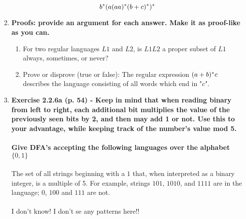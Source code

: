 \begin{enumerate}
$$  b{}^\ast (a(aa){}^\ast (b + c){}^\ast ){}^\ast $$
\newpage
\item \textbf{Proofs: provide an argument for each answer. Make it as
  proof-like as you can.}
\begin{enumerate}
  \item For two regular languages $L1$ and $L2$, is $L1L2$ a proper subset of
    $L1$ always, sometimes, or never?
  \item Prove or disprove (true or false): The regular expression $(a+b){}^\ast c$
    describes the language consisting of all words which end in "$c$".
\end{enumerate}

\newpage
\item \textbf{Exercise 2.2.6a (p. 54) - Keep in mind that when reading binary
  from left to right, each additional bit multiplies the value of the
  previously seen bits by 2, and then may add 1 or not. Use this to your
  advantage, while keeping track of the number's value mod 5.}
\\\\\textbf{Give DFA's accepting the following languages over the alphabet $\{0,1\}$}
\\\\ The set of all strings beginning with a $1$ that, when interpreted as a binary integer, is a 
multiple of 5.  For example, strings $101$, $1010$, and $1111$ are in the language; $0$, $100$
and $111$ are not.
\\\\
I don't know!  I don't se any patterns here!!


\end{enumerate}


